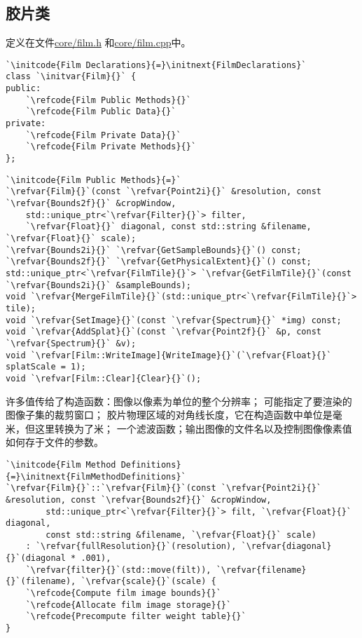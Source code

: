 \subsection{胶片类}\label{sub:胶片类}
定义在文件\href{https://github.com/mmp/pbrt-v3/blob/master/src/core/film.h}{\ttfamily core/film.h}
和\href{https://github.com/mmp/pbrt-v3/blob/master/src/core/film.cpp}{\ttfamily core/film.cpp}中。
\begin{lstlisting}
`\initcode{Film Declarations}{=}\initnext{FilmDeclarations}`
class `\initvar{Film}{}` {
public:
    `\refcode{Film Public Methods}{}`
    `\refcode{Film Public Data}{}`
private:
    `\refcode{Film Private Data}{}`
    `\refcode{Film Private Methods}{}`
};
\end{lstlisting}
\begin{lstlisting}
`\initcode{Film Public Methods}{=}`
`\refvar{Film}{}`(const `\refvar{Point2i}{}` &resolution, const `\refvar{Bounds2f}{}` &cropWindow,
    std::unique_ptr<`\refvar{Filter}{}`> filter,
    `\refvar{Float}{}` diagonal, const std::string &filename, `\refvar{Float}{}` scale);
`\refvar{Bounds2i}{}` `\refvar{GetSampleBounds}{}`() const;
`\refvar{Bounds2f}{}` `\refvar{GetPhysicalExtent}{}`() const;
std::unique_ptr<`\refvar{FilmTile}{}`> `\refvar{GetFilmTile}{}`(const `\refvar{Bounds2i}{}` &sampleBounds);
void `\refvar{MergeFilmTile}{}`(std::unique_ptr<`\refvar{FilmTile}{}`> tile);
void `\refvar{SetImage}{}`(const `\refvar{Spectrum}{}` *img) const;
void `\refvar{AddSplat}{}`(const `\refvar{Point2f}{}` &p, const `\refvar{Spectrum}{}` &v);
void `\refvar[Film::WriteImage]{WriteImage}{}`(`\refvar{Float}{}` splatScale = 1);
void `\refvar[Film::Clear]{Clear}{}`();
\end{lstlisting}

许多值传给了构造函数：图像以像素为单位的整个分辨率；
可能指定了要渲染的图像子集的裁剪窗口；
胶片物理区域的对角线长度，它在构造函数中单位是毫米，但这里转换为了米；
一个滤波函数；输出图像的文件名以及控制图像像素值如何存于文件的参数。
\begin{lstlisting}
`\initcode{Film Method Definitions}{=}\initnext{FilmMethodDefinitions}`
`\refvar{Film}{}`::`\refvar{Film}{}`(const `\refvar{Point2i}{}` &resolution, const `\refvar{Bounds2f}{}` &cropWindow,
        std::unique_ptr<`\refvar{Filter}{}`> filt, `\refvar{Float}{}` diagonal,
        const std::string &filename, `\refvar{Float}{}` scale)
    : `\refvar{fullResolution}{}`(resolution), `\refvar{diagonal}{}`(diagonal * .001),
    `\refvar{filter}{}`(std::move(filt)), `\refvar{filename}{}`(filename), `\refvar{scale}{}`(scale) {
    `\refcode{Compute film image bounds}{}`
    `\refcode{Allocate film image storage}{}`
    `\refcode{Precompute filter weight table}{}`
}
\end{lstlisting}

